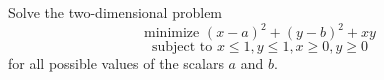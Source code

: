 \begin{proposition}
    Solve the two-dimensional problem
    \[\text{minimize } (x-a)^2+(y-b)^2+xy\]
    \[\text{subject to } x \leq 1, y \leq 1, x \geq 0, y \geq 0\]
    for all possible values of the scalars \(a\) and \(b\).
\end{proposition}